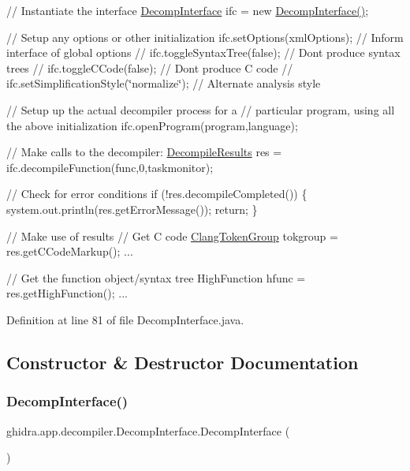 // Instantiate the interface \mbox{\hyperlink{classghidra_1_1app_1_1decompiler_1_1_decomp_interface}{Decomp\+Interface}} ifc = new \mbox{\hyperlink{classghidra_1_1app_1_1decompiler_1_1_decomp_interface_a8718a4830e01b22a87062178f37cba19}{Decomp\+Interface()}};

// Setup any options or other initialization ifc.\+set\+Options(xml\+Options); // Inform interface of global options // ifc.\+toggle\+Syntax\+Tree(false); // Don\textquotesingle{}t produce syntax trees // ifc.\+toggle\+C\+Code(false); // Don\textquotesingle{}t produce C code // ifc.\+set\+Simplification\+Style(\char`\"{}normalize\char`\"{}); // Alternate analysis style

// Setup up the actual decompiler process for a // particular program, using all the above initialization ifc.\+open\+Program(program,language);

// Make calls to the decompiler\+: \mbox{\hyperlink{classghidra_1_1app_1_1decompiler_1_1_decompile_results}{Decompile\+Results}} res = ifc.\+decompile\+Function(func,0,taskmonitor);

// Check for error conditions if (!res.decompile\+Completed()) \{ system.\+out.\+println(res.\+get\+Error\+Message()); return; \}

// Make use of results // Get C code \mbox{\hyperlink{classghidra_1_1app_1_1decompiler_1_1_clang_token_group}{Clang\+Token\+Group}} tokgroup = res.\+get\+C\+Code\+Markup(); ...

// Get the function object/syntax tree High\+Function hfunc = res.\+get\+High\+Function(); ... 

Definition at line 81 of file Decomp\+Interface.\+java.



\subsection{Constructor \& Destructor Documentation}
\mbox{\label{classghidra_1_1app_1_1decompiler_1_1_decomp_interface_a8718a4830e01b22a87062178f37cba19}} 
\subsubsection{\texorpdfstring{DecompInterface()}{DecompInterface()}}
{\footnotesize\ttfamily ghidra.\+app.\+decompiler.\+Decomp\+Interface.\+Decomp\+Interface (\begin{DoxyParamCaption}{ }\end{DoxyParamCaption})\hspace{0.3cm}{\ttfamily [inline]}}



